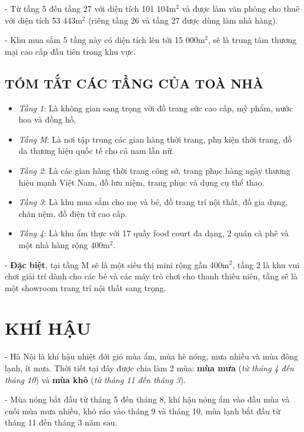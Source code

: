 	- Từ tầng 5 đến tầng 27 với diện tích 101 104m$^{2}$ và được làm văn phòng cho thuê với diện tích 53 443m$^{2}$ (riêng tầng 26 và tầng 27 được dùng làm nhà hàng).	
		
	- Khu mua sắm 5 tầng này có diện tích lên tới 15 000m$^{2}$, sẽ là trung tâm thương mại cao cấp đầu tiên trong khu vực.
	
	\subsection{TÓM TẮT CÁC TẦNG CỦA TOÀ NHÀ}
	\begin{itemize}
	\setlength\itemsep{1mm}
		\item \emph{Tầng 1}: Là không gian sang trọng với đồ trang sức cao cấp, mỹ phẩm, nước hoa và đồng hồ.
	
		\item \emph{Tầng M}: Là nơi tập trung các gian hàng thời trang, phụ kiện thời trang, đồ da thương hiệu quốc tế cho cả nam lẫn nữ.
	
		\item \emph{Tầng 2}: Là các gian hàng thời trang công sở, trang phục hàng ngày thương hiệu mạnh Việt Nam, đồ lưu niệm, trang phục và dụng cụ thể thao.
	
		\item \emph{Tầng 3}: Là khu mua sắm cho mẹ và bé, đồ trang trí nội thất, đồ gia dụng, chăn nệm, đồ điện tử cao cấp.
	
		\item \emph{Tầng 4}: Là khu ẩm thực với 17 quầy food court đa dạng, 2 quán cà phê và một nhà hàng rộng 400m$^{2}$.
	\end{itemize}
	
	- \textbf{Đặc biệt}, tại tầng M sẽ là một siêu thị mini rộng gần 400m$^{2}$, tầng 2 là khu vui chơi giải trí dành cho các bé và các máy trò chơi cho thanh thiếu niên, tầng sẽ là một showroom trang trí nội thất sang trọng.
	
	\section{KHÍ HẬU}
	- Hà Nội là khí hậu nhiệt đới gió mùa ẩm, mùa hè nóng, mưa nhiều và mùa đông lạnh, ít mưa. Thời tiết tại đây được chia làm 2 mùa: \textbf{mùa mưa} (\emph{từ tháng 4 đến tháng 10}) và \textbf{mùa khô} (\emph{từ tháng 11 đến tháng 3}).
	
	- Mùa nóng bắt đầu từ tháng 5 đến tháng 8, khí hậu nóng ẩm vào đầu mùa và cuối mùa mưa nhiều, khô ráo vào tháng 9 và tháng 10, mùa lạnh bắt đầu từ tháng 11 đến tháng 3 năm sau.
	
